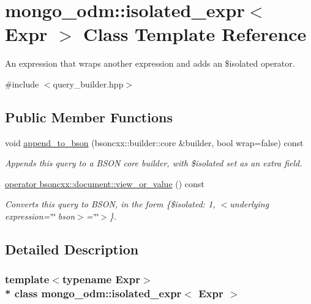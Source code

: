\hypertarget{classmongo__odm_1_1isolated__expr}{}\section{mongo\+\_\+odm\+:\+:isolated\+\_\+expr$<$ Expr $>$ Class Template Reference}
\label{classmongo__odm_1_1isolated__expr}


An expression that wraps another expression and adds an \$isolated operator.  




{\ttfamily \#include $<$query\+\_\+builder.\+hpp$>$}

\subsection*{Public Member Functions}
\begin{DoxyCompactItemize}
\item 
void \hyperlink{classmongo__odm_1_1isolated__expr_abb41dc8fb33aa4e7d83ac7a9579baba6}{append\+\_\+to\+\_\+bson} (bsoncxx\+::builder\+::core \&builder, bool wrap=false) const 
\begin{DoxyCompactList}\small\item\em Appends this query to a B\+S\+ON core builder, with \$isolated set as an extra field. \end{DoxyCompactList}\item 
\hyperlink{classmongo__odm_1_1isolated__expr_a81fb5f0e8711bfcbea0ee3cc9f2e1b03}{operator bsoncxx\+::document\+::view\+\_\+or\+\_\+value} () const \hypertarget{classmongo__odm_1_1isolated__expr_a81fb5f0e8711bfcbea0ee3cc9f2e1b03}{}\label{classmongo__odm_1_1isolated__expr_a81fb5f0e8711bfcbea0ee3cc9f2e1b03}

\begin{DoxyCompactList}\small\item\em Converts this query to B\+S\+ON, in the form \{\$isolated\+: 1, $<$underlying expression=\char`\"{}\char`\"{} bson$>$=\char`\"{}\char`\"{}$>$\}. \end{DoxyCompactList}\end{DoxyCompactItemize}


\subsection{Detailed Description}
\subsubsection*{template$<$typename Expr$>$\\*
class mongo\+\_\+odm\+::isolated\+\_\+expr$<$ Expr $>$}

